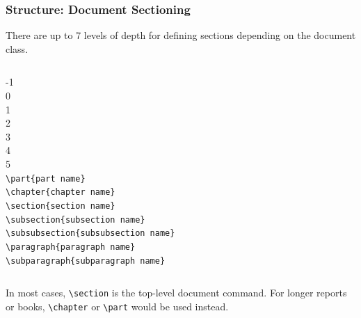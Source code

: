 \begin{frame}[fragile]
\frametitle{Structure: Document Sectioning}
There are up to 7 levels of depth for defining sections depending on the document class. \pause
\begin{exampleblock}{}
    \begin{columns}
        -1 \\
        0 \\
        1 \\
        2 \\
        3 \\
        4 \\
        5 \\
        \verb|\part{part name}| \\
        \verb|\chapter{chapter name}| \\
        \verb|\section{section name}| \\
        \verb|\subsection{subsection name}| \\
        \verb|\subsubsection{subsubsection name}| \\
        \verb|\paragraph{paragraph name}| \\
        \verb|\subparagraph{subparagraph name}| \\
    \end{columns}
\end{exampleblock} \pause
In most cases, \verb|\section| is the top-level document command. For longer reports or books, \verb|\chapter| or \verb|\part| would be used instead.
\end{frame}


